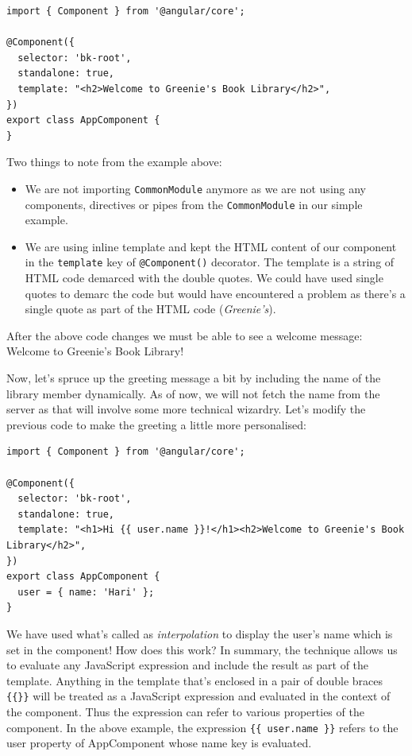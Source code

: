 \documentclass{report}
\begin{document}
\begin{Verbatim}[label=v2.1.0]
import { Component } from '@angular/core';

@Component({
  selector: 'bk-root',
  standalone: true,
  template: "<h2>Welcome to Greenie's Book Library</h2>",
})
export class AppComponent {
}
\end{Verbatim}

Two things to note from the example above:
\begin{itemize}
\item We are not importing \verb|CommonModule| anymore as we are not using any components, directives or pipes from the \verb|CommonModule| in our simple example.
\item We are using inline template and kept the HTML content of our component in the \verb|template| key of \verb|@Component()| decorator. The template is a string of HTML code demarced with the double quotes. We could have used single quotes to demarc the code but would have encountered a problem as there's a single quote as part of the HTML code (\textsl{Greenie's}).
\end{itemize}

After the above code changes we must be able to see a welcome message: Welcome to Greenie's Book Library!

Now, let's spruce up the greeting message a bit by including the name of the library member dynamically. As of now, we will not fetch the name from the server as that will involve some more technical wizardry. Let's modify the previous code to make the greeting a little more personalised:

\begin{Verbatim}[label=v2.1.1]
import { Component } from '@angular/core';

@Component({
  selector: 'bk-root',
  standalone: true,
  template: "<h1>Hi {{ user.name }}!</h1><h2>Welcome to Greenie's Book Library</h2>",
})
export class AppComponent {
  user = { name: 'Hari' };
}
\end{Verbatim}

We have used what's called as \textsl{interpolation} to display the user's name which is set in the component! How does this work? In summary, the technique allows us to evaluate any JavaScript expression and include the result as part of the template. Anything in the template that's enclosed in a pair of double braces \verb|{{}}| will be treated as a JavaScript expression and evaluated in the context of the component. Thus the expression can refer to various properties of the component. In the above example, the expression \verb|{{ user.name }}| refers to the user property of AppComponent whose name key is evaluated.
\end{document}
